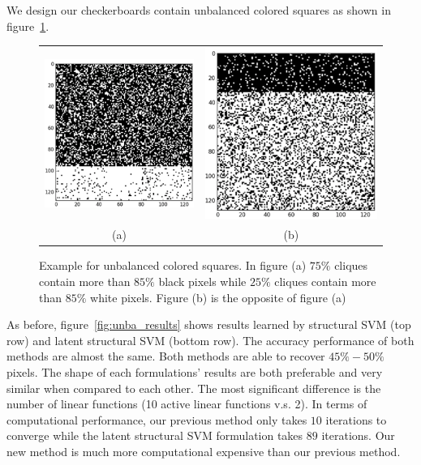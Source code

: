 We design our checkerboards contain unbalanced colored squares as
shown in figure~\ref{fig:unba_checkerboard}.

\begin{figure}[hb]
  \centering
  \setlength{\tabcolsep}{2pt}
  \begin{tabular}{cc}
    \includegraphics[width=0.5\columnwidth]{Experiments/figures/unba_black.png}&
                                                                            \includegraphics[width=0.5\columnwidth]{Experiments/figures/unba_white.png}\\
    {\small (a)} & {\small (b)} 
  \end{tabular}
  \caption{\label{fig:unba_checkerboard} Example for unbalanced
    colored squares. In figure (a) $75\%$ cliques contain more
    than $85\%$ black pixels while $25\%$ cliques contain more
    than $85\%$ white pixels. Figure (b) is the opposite of
    figure (a)}
\end{figure}

As before, figure~\ref{fig:unba_results} shows results learned by
structural SVM (top row) and latent structural SVM (bottom row).
The accuracy performance of both methods are almost the same.
Both methods are able to recover $45\%-50\%$ pixels. The shape of
each formulations' results are both preferable and very similar
when compared to each other. The most significant difference is
the number of linear functions (10 active linear functions v.s.
2). In terms of computational performance, our previous method
only takes $10$ iterations to converge while the latent
structural SVM formulation takes $89$ iterations. Our new method
is much more computational expensive than our previous method.

